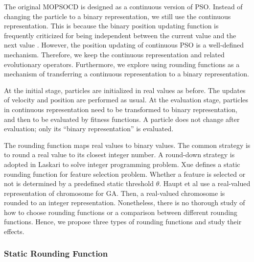 \documentclass[10pt,journal,compsoc]{IEEEtran}
\begin{document}
The original MOPSOCD is designed as a continuous version of PSO. Instead of changing the particle to a binary representation, we still use the continuous representation. This is because the binary position updating function is frequently criticized for being independent between the current value and the next value \cite{khanesar2007novel}. However, the position updating of continuous PSO is a well-defined mechanism. Therefore, we keep the continuous representation and related evolutionary operators. Furthermore, we explore using rounding functions as a mechanism of transferring a continuous representation to a binary representation.


At the initial stage, particles are initialized in real values as before. The updates of velocity and position are performed as usual. At the evaluation stage, particles in continuous representation need to be transformed to binary representation, and then to be evaluated by fitness functions. A particle does not change after evaluation; only its ``binary representation'' is evaluated. 

The rounding function maps real values to binary values. The common strategy is to round a real value to its closest integer number. A round-down strategy is adopted in Laskari \cite{1004478} to solve integer programming problem. Xue \cite{xue2013particle} defines a static rounding function for feature selection problem. Whether a feature is selected or not is determined by a predefined static threshold $\theta$. Haupt et al\cite{4120263} use a real-valued representation of chromosome for GA. Then, a real-valued chromosome is rounded to an integer representation. Nonetheless, there is no thorough study of how to choose rounding functions or a comparison between different rounding functions. Hence, we propose three types of rounding functions and study their effects.

\vspace{-3 mm}
\subsubsection{Static Rounding Function}
\end{document}
